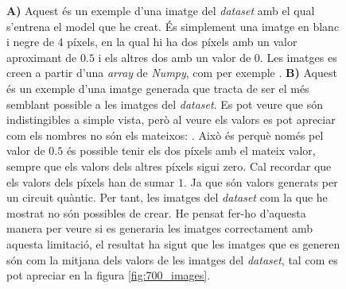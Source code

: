 \begin{figure}
	\caption{\textbf{A)} Aquest és un exemple d'una imatge del \textit{dataset} amb el qual s'entrena el model que he creat. És simplement una imatge en blanc i negre de 4 píxels, en la qual hi ha dos píxels amb un valor aproximant de $0.5$ i els altres dos amb un valor de $0$. Les imatges es creen a partir d'una \textit{array} de \textit{Numpy}, com per exemple . \textbf{B)} Aquest és un exemple d'una imatge generada que tracta de ser el més semblant possible a les imatges del \textit{dataset}. Es pot veure que són indistingibles a simple vista, però al veure els valors es pot apreciar com els nombres no són els mateixos:  . Això és perquè només pel valor de $0.5$ és possible tenir els dos píxels amb el mateix valor, sempre que els valors dels altres píxels sigui zero. Cal recordar que els valors dels píxels han de sumar $1$. Ja que són valors generats per un circuit quàntic. Per tant, les imatges del \textit{dataset} com la que he mostrat no són possibles de crear. He pensat fer-ho d'aquesta manera per veure si es generaria les imatges correctament amb aquesta limitació, el resultat ha sigut que les imatges que es generen són com la mitjana dels valors de les imatges del \textit{dataset}, tal com es pot apreciar en la figura \ref{fig:700_images}. }
	\label{fig:test_images}
\end{figure}


